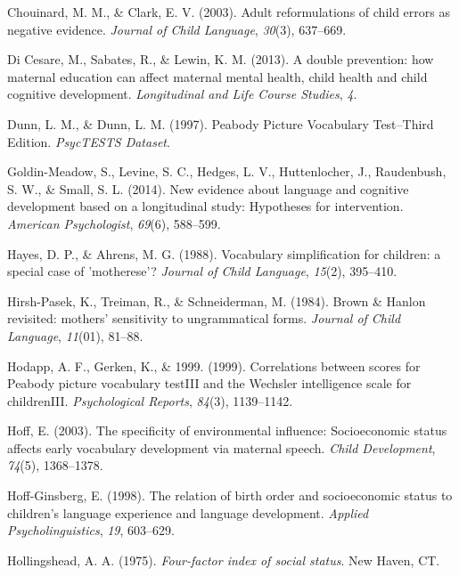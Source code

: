 \documentclass[10pt, letterpaper]{article}
\begin{document}
\leavevmode\hypertarget{ref-Chouinard:2003kq}{}%
Chouinard, M. M., \& Clark, E. V. (2003). Adult reformulations of child
errors as negative evidence. \emph{Journal of Child Language},
\emph{30}(3), 637--669.

\leavevmode\hypertarget{ref-DiCesare:2013ip}{}%
Di Cesare, M., Sabates, R., \& Lewin, K. M. (2013). A double prevention:
how maternal education can affect maternal mental health, child health
and child cognitive development. \emph{Longitudinal and Life Course
Studies}, \emph{4}.

\leavevmode\hypertarget{ref-PeabodyPictureVoca:im}{}%
Dunn, L. M., \& Dunn, L. M. (1997). Peabody Picture Vocabulary
Test--Third Edition. \emph{PsycTESTS Dataset}.

\leavevmode\hypertarget{ref-GoldinMeadow:2014hr}{}%
Goldin-Meadow, S., Levine, S. C., Hedges, L. V., Huttenlocher, J.,
Raudenbush, S. W., \& Small, S. L. (2014). New evidence about language
and cognitive development based on a longitudinal study: Hypotheses for
intervention. \emph{American Psychologist}, \emph{69}(6), 588--599.

\leavevmode\hypertarget{ref-Hayes:1988ue}{}%
Hayes, D. P., \& Ahrens, M. G. (1988). Vocabulary simplification for
children: a special case of 'motherese'? \emph{Journal of Child
Language}, \emph{15}(2), 395--410.

\leavevmode\hypertarget{ref-HirshPasek:1984bd}{}%
Hirsh-Pasek, K., Treiman, R., \& Schneiderman, M. (1984). Brown \&
Hanlon revisited: mothers' sensitivity to ungrammatical forms.
\emph{Journal of Child Language}, \emph{11}(01), 81--88.

\leavevmode\hypertarget{ref-Hodapp:1999ih}{}%
Hodapp, A. F., Gerken, K., \& 1999. (1999). Correlations between scores
for Peabody picture vocabulary testIII and the Wechsler intelligence
scale for childrenIII. \emph{Psychological Reports}, \emph{84}(3),
1139--1142.

\leavevmode\hypertarget{ref-Hoff:2003kx}{}%
Hoff, E. (2003). The specificity of environmental influence:
Socioeconomic status affects early vocabulary development via maternal
speech. \emph{Child Development}, \emph{74}(5), 1368--1378.

\leavevmode\hypertarget{ref-HoffGinsberg:2008up}{}%
Hoff-Ginsberg, E. (1998). The relation of birth order and socioeconomic
status to children's language experience and language development.
\emph{Applied Psycholinguistics}, \emph{19}, 603--629.

\leavevmode\hypertarget{ref-Hollingshead:1975wn}{}%
Hollingshead, A. A. (1975). \emph{Four-factor index of social status}.
New Haven, CT.
\end{document}
